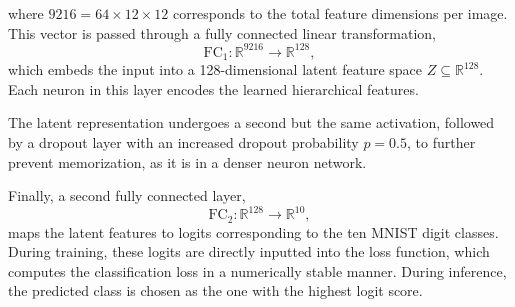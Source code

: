 \documentclass{article}
\begin{document}
\noindent
where \(9216 = 64 \times 12 \times 12\) corresponds to the total feature dimensions per image.
This vector is passed through a fully connected linear transformation,
\[
\text{FC}_1 : \mathbb{R}^{9216} \rightarrow \mathbb{R}^{128},
\]
which embeds the input into a 128-dimensional latent feature space \(Z \subseteq \mathbb{R}^{128}\). Each neuron in this layer encodes the learned hierarchical features.


\vspace{4pt}
\noindent
The latent representation undergoes a second but the same activation, followed by a dropout layer with an increased dropout probability \(p = 0.5\), to further prevent memorization, as it is in a denser neuron network.

\vspace{4pt}
\noindent
Finally, a second fully connected layer,
\[
\text{FC}_2 : \mathbb{R}^{128} \rightarrow \mathbb{R}^{10},
\]
maps the latent features to logits corresponding to the ten MNIST digit classes. During training, these logits are directly inputted into the loss function, which
computes the classification loss in a numerically stable manner. During inference, the predicted class is chosen as the one with the highest logit score.
\end{document}

